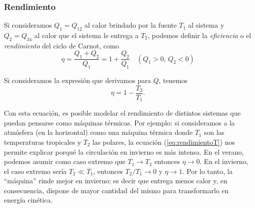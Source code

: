 \documentclass[openany]{book}
\begin{document}
\subsubsection{Rendimiento}
Si consideramos $Q_1=Q_{12}$ al calor brindado por la fuente $T_1$ al sistema y $Q_2=Q_{34}$ al calor que el sistema le entrega a $T_2$, podemos definir la \emph{eficiencia} o el \emph{rendimiento} del ciclo de Carnot, como
\begin{equation}\label{eq:rendimientoQ}
	\eta=\frac{Q_1+Q_2}{Q_1}=1+\frac{Q_2}{Q_1}\quad (Q_1>0,\,Q_2<0)
\end{equation}

Si consideramos la expresión que derivamos para $Q$, tenemos
\begin{equation}\label{eq:rendimientoT}
	\eta=1-\frac{T_2}{T_1}.
\end{equation}
\par Con esta ecuación, es posible modelar el rendimiento de distintos sistemas que puedan pensarse como máquinas térmicas. Por ejemplo: si consideramos a la atmósfera (en la horizontal) como una máquina térmica donde $T_1$ son las temperaturas tropicales y $T_2$ las polares, la ecuación (\ref{eq:rendimientoT}) nos permite explicar porqué la circulación en invierno es más intensa. En el verano, podemos asumir como caso extremo que $T_1\rightarrow T_2$ entonces $\eta\rightarrow0$. En el invierno, el caso extremo sería $T_2\ll T_1$, entonces $T_2/T_1\rightarrow0$ y $\eta\rightarrow1$. Por lo tanto, la ``máquina'' rinde mejor en invierno; es decir que entrega menos calor y, en consecuencia, dispone de mayor cantidad del mismo para transformarlo en energía cinética.
\end{document}
